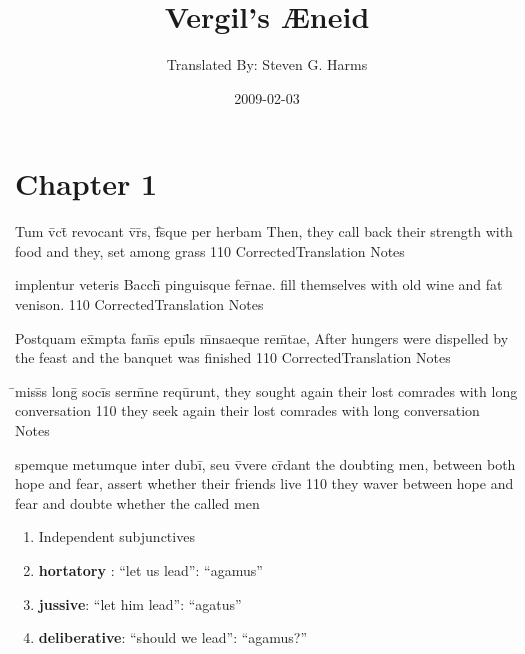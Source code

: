 \documentclass[]{book}
\title{Vergil's {\AE}neid}
\author{ Translated By:  Steven G. Harms }
\date{2009-02-03}
\begin{document}

\ifpdf
{}
\else
{}
\fi

\enumstyle 

\maketitle
\tableofcontents

\chapter{Chapter 1}
%
%
%
%
%
%
%

\latline
  {Tum v\={\macron {\i}}ct\={} revocant v\={\macron {\i}}r\={\macron {\i}}s, f\={}s\={\macron {\i}}que per herbam}
  { Then, they call back their strength with food and they, set among grass }
  {110}
  { CorrectedTranslation }
  { Notes }


\latline
  {implentur veteris Bacch\={\macron {\i}} pinguisque fer\={\macron {\i}}nae.}
  { fill themselves with old wine and fat venison. }
  {110}
  { CorrectedTranslation }
  { Notes }


\latline
  {Postquam ex\={}mpta fam\={}s epul\={\macron {\i}}s m\={}nsaeque rem\={}tae,}
  { After hungers were dispelled by the feast and the banquet was finished }
  {110}
  { CorrectedTranslation }
  { Notes }


\latline
  {\={}miss\={}s long\={} soci\={}s serm\={}ne requ\={\macron {\i}}runt,}
  { they sought again their lost comrades with long conversation }
  {110}
  { they seek again their lost comrades with long conversation }
  { Notes }


\latline
  {spemque metumque inter dubi\={\macron {\i}}, seu v\={\macron {\i}}vere cr\={}dant}
  { the doubting men, between both hope and fear, assert whether their friends live }
  {110}
  { they waver between hope and fear and doubte whether the called men}
  { \begin{enumerate}
  	\item Independent subjunctives
		\item \textbf{hortatory} :  ``let us lead'':  ``agamus''
		\item \textbf{jussive}:  ``let him lead'': ``agatus''
		\item \textbf{deliberative}:  ``should we lead'': ``agamus?''
  \end{enumerate} }
\end{document}
